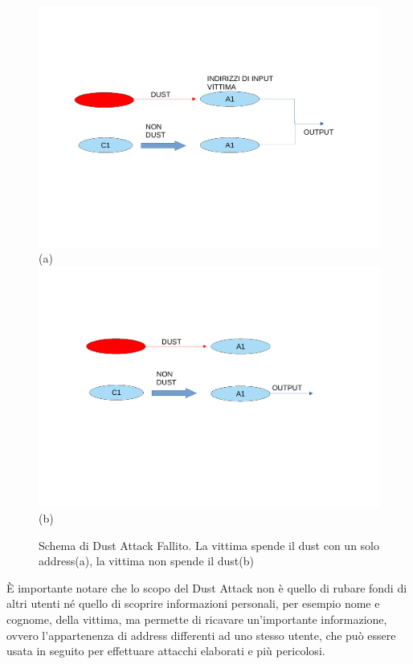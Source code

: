 \begin{figure}[h!]
    \centering
    \includegraphics[scale=0.5, trim = 1cm 6cm 0cm 3cm, clip]{Images/fallito2.pdf}
    (a)
    \includegraphics[scale=0.5, trim = 1cm 7cm 0cm 2cm, clip]{Images/fallito1.pdf}
    (b)
    \caption{Schema di Dust Attack Fallito. La vittima spende il dust con un solo address(a), la vittima non spende il dust(b)}
    \label{fig:fallito}
\end{figure}
\FloatBarrier

È importante notare che lo scopo del Dust Attack non è quello di rubare fondi di altri utenti né quello di scoprire informazioni personali, per esempio nome e cognome, della vittima, ma permette di ricavare un'importante informazione, ovvero l'appartenenza di address differenti ad uno stesso utente, che può essere usata in seguito per effettuare attacchi elaborati e più pericolosi.

